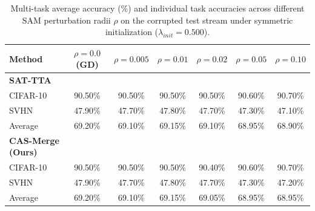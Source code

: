 \documentclass{article}
\begin{document}
\begin{table}[h]
\caption{Multi-task average accuracy (\%) and individual task accuracies across different SAM perturbation radii $\rho$ on the corrupted test stream under symmetric initialization ($\lambda_{init} = 0.500$).}
\label{tab:rho_results}
\vskip 0.1in
\begin{center}
\begin{small}
\begin{sc}
\begin{tabular}{lcccccc}
\toprule
\textbf{Method} & \textbf{$\rho = 0.0$ (GD)} & \textbf{$\rho = 0.005$} & \textbf{$\rho = 0.01$} & \textbf{$\rho = 0.02$} & \textbf{$\rho = 0.05$} & \textbf{$\rho = 0.10$} \\
\midrule
\textbf{SAT-TTA} & & & & & & \\
\quad CIFAR-10 & 90.50\% & 90.50\% & 90.50\% & 90.50\% & 90.60\% & 90.70\% \\
\quad SVHN     & 47.90\% & 47.70\% & 47.80\% & 47.70\% & 47.30\% & 47.10\% \\
\quad Average  & 69.20\% & 69.10\% & 69.15\% & 69.10\% & 68.95\% & 68.90\% \\
\midrule
\textbf{CAS-Merge (Ours)} & & & & & & \\
\quad CIFAR-10 & 90.50\% & 90.50\% & 90.50\% & 90.40\% & 90.60\% & 90.70\% \\
\quad SVHN     & 47.90\% & 47.70\% & 47.80\% & 47.70\% & 47.30\% & 47.20\% \\
\quad Average  & 69.20\% & 69.10\% & 69.15\% & 69.05\% & 68.95\% & 68.95\% \\
\bottomrule
\end{tabular}
\end{sc}
\end{small}
\end{center}
\end{table}
\end{document}
